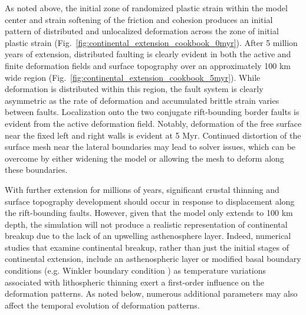 As noted above, the initial zone of randomized plastic strain within the model center and strain softening of the friction and cohesion produces an initial pattern of distributed and unlocalized deformation across the zone of initial plastic strain (Fig.~\ref{fig:continental_extension_cookbook_0myr}). After 5 million years of extension, distributed faulting is clearly evident in both the active and finite deformation fields and surface topography over an approximately 100 km wide region (Fig.~\ref{fig:continental_extension_cookbook_5myr}). While deformation is distributed within this region, the fault system is clearly asymmetric as the rate of deformation and accumulated brittle strain varies between faults. Localization onto the two conjugate rift-bounding border faults is evident from the active deformation field. Notably, deformation of the free surface near the fixed left and right walls is evident at 5 Myr. Continued distortion of the surface mesh near the lateral boundaries may lead to solver issues, which can be overcome by either widening the model or allowing the mesh to deform along these boundaries.  

With further extension for millions of years, significant crustal thinning and surface topography development should occur in response to displacement along the rift-bounding faults. However, given that the model only extends to 100 km depth, the simulation will not produce a realistic representation of continental breakup due to the lack of an upwelling asthenosphere layer. Indeed, numerical studies that examine continental breakup, rather than just the initial stages of continental extension, include an asthenospheric layer or modified basal boundary conditions (e.g. Winkler boundary condition \cite[for example]{Bru14}) as temperature variations associated with lithospheric thinning exert a first-order influence on the deformation patterns. As noted below, numerous additional parameters may also affect the temporal evolution of deformation patterns.


